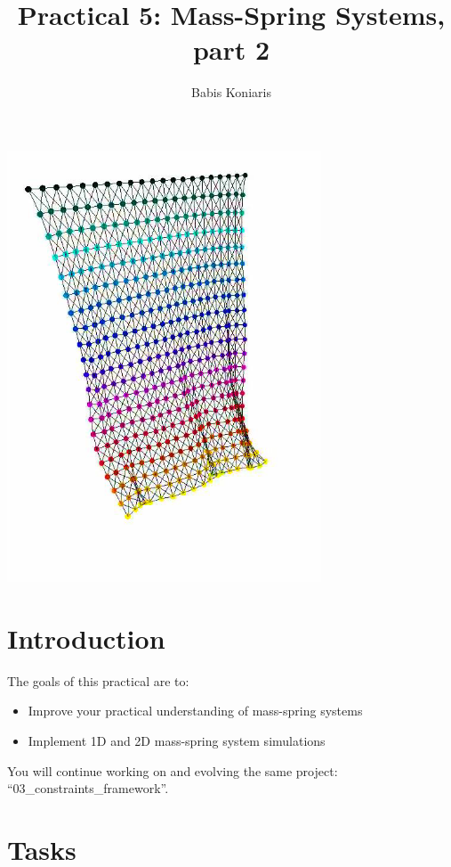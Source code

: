 \documentclass[12pt]{article}
\title{\textbf{Practical 5: Mass-Spring Systems, part 2 }}
\author{Babis Koniaris}
\date{}
\begin{document}
\maketitle

\begin{center}
\includegraphics[width=0.7\textwidth,height=\textheight,keepaspectratio]{p5-teaser.png}
\end{center}
\pagebreak

\section*{Introduction}

The goals of this practical are to:

\begin{itemize}
\item Improve your practical understanding of mass-spring systems
\item Implement 1D and 2D mass-spring system simulations
\end{itemize}

You will continue working on and evolving the same project: ``03\_constraints\_framework''.

\section*{Tasks}
\end{document}
